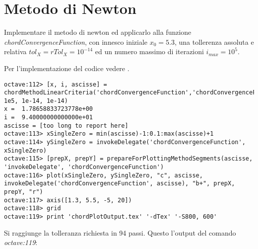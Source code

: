 \section{Metodo di Newton}
\label{sec:metodoDiNewton}

\begin{exercise}
Implementare il metodo di newton ed applicarlo alla funzione \emph{chordConvergenceFunction},
con innesco iniziale $x_{0} = 5.3$, una tollerenza assoluta e relativa
$tol_{X} = rTol_{X} = 10^{-14}$ ed un numero massimo di iterazioni
$i_{max} = 10^{5}$.
\end{exercise}
Per l'implementazione del codice vedere .
\begin{lstlisting}
octave:112> [x, i, ascisse] =
chordMethodLinearCriteria('chordConvergenceFunction','chordConvergenceFunctionDerivative',5.3, 1e5, 1e-14, 1e-14) 
x =  1.78658833723778e+00
i =  9.40000000000000e+01
ascisse = [too long to report here]
octave:113> xSingleZero = min(ascisse)-1:0.1:max(ascisse)+1
octave:114> ySingleZero = invokeDelegate('chordConvergenceFunction', xSingleZero)
octave:115> [prepX, prepY] = prepareForPlottingMethodSegments(ascisse, 'invokeDelegate', 'chordConvergenceFunction')
octave:116> plot(xSingleZero, ySingleZero, "c", ascisse, invokeDelegate('chordConvergenceFunction', ascisse), "b+", prepX, prepY, "r")
octave:117> axis([1.3, 5.5, -5, 20])
octave:118> grid
octave:119> print 'chordPlotOutput.tex' '-dTex' '-S800, 600'
\end{lstlisting}
Si raggiunge la tolleranza richiesta in 94 passi. Questo l'output del comando
\emph{octave:119}:
\begin{center}

\end{center}
